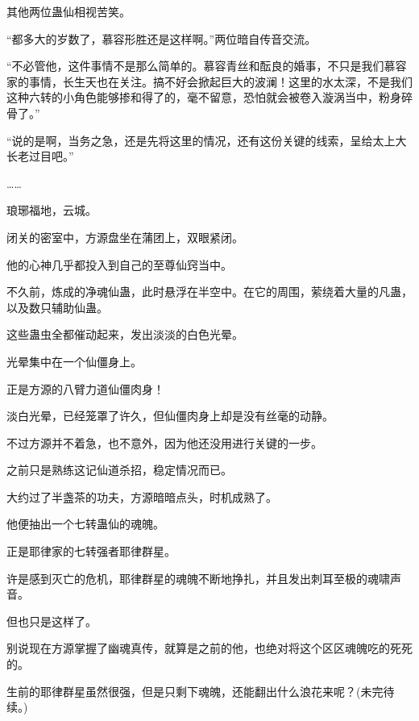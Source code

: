 \begin{this_body}
其他两位蛊仙相视苦笑。

“都多大的岁数了，慕容形胜还是这样啊。”两位暗自传音交流。

“不必管他，这件事情不是那么简单的。慕容青丝和酝良的婚事，不只是我们慕容家的事情，长生天也在关注。搞不好会掀起巨大的波澜！这里的水太深，不是我们这种六转的小角色能够掺和得了的，毫不留意，恐怕就会被卷入漩涡当中，粉身碎骨了。”

“说的是啊，当务之急，还是先将这里的情况，还有这份关键的线索，呈给太上大长老过目吧。”

……

琅琊福地，云城。

闭关的密室中，方源盘坐在蒲团上，双眼紧闭。

他的心神几乎都投入到自己的至尊仙窍当中。

不久前，炼成的净魂仙蛊，此时悬浮在半空中。在它的周围，萦绕着大量的凡蛊，以及数只辅助仙蛊。

这些蛊虫全都催动起来，发出淡淡的白色光晕。

光晕集中在一个仙僵身上。

正是方源的八臂力道仙僵肉身！

淡白光晕，已经笼罩了许久，但仙僵肉身上却是没有丝毫的动静。

不过方源并不着急，也不意外，因为他还没用进行关键的一步。

之前只是熟练这记仙道杀招，稳定情况而已。

大约过了半盏茶的功夫，方源暗暗点头，时机成熟了。

他便抽出一个七转蛊仙的魂魄。

正是耶律家的七转强者耶律群星。

许是感到灭亡的危机，耶律群星的魂魄不断地挣扎，并且发出刺耳至极的魂啸声音。

但也只是这样了。

别说现在方源掌握了幽魂真传，就算是之前的他，也绝对将这个区区魂魄吃的死死的。

生前的耶律群星虽然很强，但是只剩下魂魄，还能翻出什么浪花来呢？(未完待续。)

\end{this_body}

